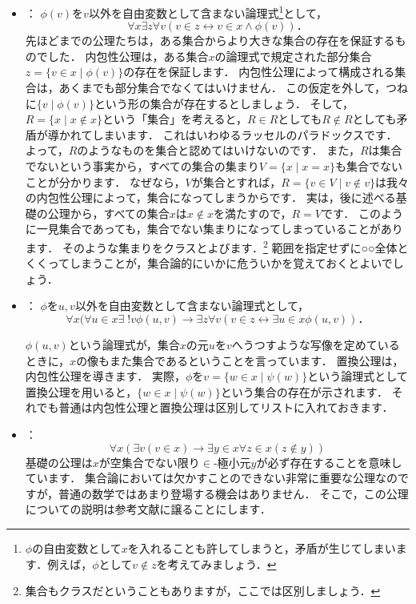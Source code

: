 \documentclass[./main]{subfiles}
\begin{document}
\begin{itemize}
\item
{}：
$\phi(v)$を$v$以外を自由変数として含まない論理式\footnote{$\phi$の自由変数として$x$を入れることも許してしまうと，矛盾が生じてしまいます．例えば，$\phi$として$v\notin z$を考えてみましょう．}として，
\[
\forall x\exists z\forall v(v\in z\leftrightarrow v\in x\wedge\phi(v))．
\]
先ほどまでの公理たちは，ある集合からより大きな集合の存在を保証するものでした．
内包性公理は，ある集合$x$の論理式で規定された部分集合$z=\{v\in x\mid\phi(v)\}$の存在を保証します．
内包性公理によって構成される集合は，あくまでも部分集合でなくてはいけません．
この仮定を外して，つねに$\{v\mid\phi(v)\}$という形の集合が存在するとしましょう．
そして，$R=\{x\mid x\notin x\}$という「集合」を考えると，$R\in R$としても$R\notin R$としても矛盾が導かれてしまいます．
これはいわゆるラッセルのパラドックスです．
よって，$R$のようなものを集合と認めてはいけないのです．
また，$R$は集合でないという事実から，すべての集合の集まり$V=\{x\mid x=x\}$も集合でないことが分かります．
なぜなら，$V$が集合とすれば，$R=\{v\in V\mid v\notin v\}$は我々の内包性公理によって，集合になってしまうからです．
実は，後に述べる基礎の公理から，すべての集合$x$は$x\notin x$を満たすので，$R=V$です．
このように一見集合であっても，集合でない集まりになってしまっていることがあります．
そのような集まりをクラスとよびます．\footnote{集合もクラスだということもありますが，ここでは区別しましょう．}
範囲を指定せずに○○全体とくくってしまうことが，集合論的にいかに危ういかを覚えておくとよいでしょう．

\item
{}：
$\phi$を$u,v$以外を自由変数として含まない論理式として，
\[
\forall x(\forall u\in x\exists\;! v\phi(u,v)\to\exists z\forall v(v\in z\leftrightarrow\exists u\in x\phi(u,v))．
\]

$\phi(u, v)$という論理式が，集合$x$の元$u$を$v$へうつすような写像を定めているときに，$x$の像もまた集合であるということを言っています．
置換公理は，内包性公理を導きます．
実際，$\phi$を$v=\{w\in x\mid \psi(w)\}$という論理式として置換公理を用いると，$\{w\in x\mid\psi(w)\}$という集合の存在が示されます．
それでも普通は内包性公理と置換公理は区別してリストに入れておきます．

\item
{}：
\[
\forall x(\exists v(v\in x)\to\exists y\in x\forall z\in x(z\notin y))
\]
基礎の公理は$x$が空集合でない限り$\in$-極小元$y$が必ず存在することを意味しています．
集合論においては欠かすことのできない非常に重要な公理なのですが，普通の数学ではあまり登場する機会はありません．
そこで，この公理についての説明は参考文献に譲ることにします．
\end{itemize}
\end{document}
